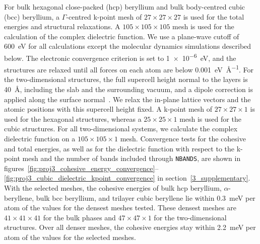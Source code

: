 For bulk hexagonal close-packed (hcp) beryllium and bulk body-centred cubic (bcc) beryllium,
a $\Gamma$-centred k-point mesh of $27 \times 27 \times 27$ is used for the total energies and structural relaxations.
A $105 \times 105 \times 105$ mesh is used for the calculation of the complex dielectric function.
We use a plane-wave cutoff of \qty{600}{\electronvolt} for all calculations except the molecular dynamics simulations described below.
The electronic convergence criterion is set to \qty{1e-6}{\electronvolt},
and the structures are relaxed until all forces on each atom are below \qty{0.001}{\electronvolt\per\angstrom}.
For the two-dimensional structures,
the full supercell height normal to the layers is \qty{40}{\angstrom}, including the slab and the surrounding vacuum,
and a dipole correction is applied along the surface normal~\cite{neugebauer1992adsorbate}.
We relax the in-plane lattice vectors and the atomic positions with this supercell height fixed.
A k-point mesh of $27 \times 27 \times 1$ is used for the hexagonal structures,
whereas a $25 \times 25 \times 1$ mesh is used for the cubic structures.
For all two-dimensional systems,
we calculate the complex dielectric function on a $105 \times 105 \times 1$ mesh.
Convergence tests for the cohesive and total energies,
as well as for the dielectric function with respect to the k-point mesh and the number of bands included through \texttt{NBANDS},
are shown in figures~\ref{fig:proj3_cohesive_energy_convergence}--\ref{fig:proj3_cubic_dielectric_kpoint_convergence} in section~\ref{3_supplementary}.
With the selected meshes,
the cohesive energies of bulk hcp beryllium,
$\alpha$-beryllene,
bulk bcc beryllium,
and trilayer cubic beryllene lie within \qty{0.3}{\milli\electronvolt} per atom of the values for the densest meshes tested.
These densest meshes are $41 \times 41 \times 41$ for the bulk phases and $47 \times 47 \times 1$ for the two-dimensional structures.
Over all denser meshes,
the cohesive energies stay within \qty{2.2}{\milli\electronvolt} per atom of the values for the selected meshes.

